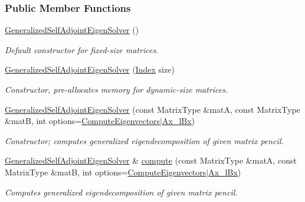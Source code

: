 \subsubsection*{Public Member Functions}
\begin{DoxyCompactItemize}
\item 
\hyperlink{group___eigenvalues___module_a501effdbf722c0609ea05ff3fd4cc721}{Generalized\+Self\+Adjoint\+Eigen\+Solver} ()
\begin{DoxyCompactList}\small\item\em Default constructor for fixed-\/size matrices. \end{DoxyCompactList}\item 
\hyperlink{group___eigenvalues___module_aac849f01a8c6148c645acd10bd3a9b0e}{Generalized\+Self\+Adjoint\+Eigen\+Solver} (\hyperlink{group___eigenvalues___module_a8a59ab7734b6eae2754fd78bc7c3a360}{Index} size)
\begin{DoxyCompactList}\small\item\em Constructor, pre-\/allocates memory for dynamic-\/size matrices. \end{DoxyCompactList}\item 
\hyperlink{group___eigenvalues___module_addc0409c9cb1a5ac9cbbd00efe68908e}{Generalized\+Self\+Adjoint\+Eigen\+Solver} (const Matrix\+Type \&matA, const Matrix\+Type \&matB, int options=\hyperlink{group__enums_ggae3e239fb70022eb8747994cf5d68b4a9ada93d8885bde32b876ba4af01d3292cc}{Compute\+Eigenvectors}$\vert$\hyperlink{group__enums_ggae3e239fb70022eb8747994cf5d68b4a9a1a7cefbb22c2c3928d246b753cf53633}{Ax\+\_\+l\+Bx})
\begin{DoxyCompactList}\small\item\em Constructor; computes generalized eigendecomposition of given matrix pencil. \end{DoxyCompactList}\item 
\hyperlink{group___eigenvalues___module_class_eigen_1_1_generalized_self_adjoint_eigen_solver}{Generalized\+Self\+Adjoint\+Eigen\+Solver} \& \hyperlink{group___eigenvalues___module_a724764fe196612b752042692156ed023}{compute} (const Matrix\+Type \&matA, const Matrix\+Type \&matB, int options=\hyperlink{group__enums_ggae3e239fb70022eb8747994cf5d68b4a9ada93d8885bde32b876ba4af01d3292cc}{Compute\+Eigenvectors}$\vert$\hyperlink{group__enums_ggae3e239fb70022eb8747994cf5d68b4a9a1a7cefbb22c2c3928d246b753cf53633}{Ax\+\_\+l\+Bx})
\begin{DoxyCompactList}\small\item\em Computes generalized eigendecomposition of given matrix pencil. \end{DoxyCompactList}\item 

\end{DoxyCompactItemize}
